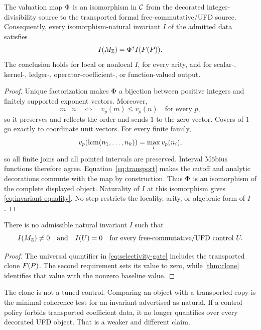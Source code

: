 \begin{theorem}
\label{thm:clone}
The valuation map \(\Phi\) is an isomorphism in \(\mathcal C\) from the
decorated integer-divisibility source to the transported formal
free-commutative/UFD source.  Consequently, every isomorphism-natural
invariant \(I\) of the admitted data satisfies
\begin{equation}
 I(M_{\mathbb Z})=\Phi^*I(F(P)).
 \label{eq:invariant-equality}
\end{equation}
The conclusion holds for local or nonlocal \(I\), for every arity, and for
scalar-, kernel-, ledger-, operator-coefficient-, or function-valued output.
\end{theorem}
\begin{proof}
Unique factorization makes \(\Phi\) a bijection between positive integers
and finitely supported exponent vectors.  Moreover,
\begin{equation}
 m\mid n
 \quad\Longleftrightarrow\quad
 v_p(m)\le v_p(n)\quad\text{for every }p,
 \label{eq:order-transport}
\end{equation}
so it preserves and reflects the order and sends \(1\) to the zero vector.
Covers of \(1\) go exactly to coordinate unit vectors.  For every finite
family,
\begin{equation}
 v_p(\operatorname{lcm}(n_1,\ldots,n_k))=\max_i v_p(n_i),
 \label{eq:join-transport}
\end{equation}
so all finite joins and all pointed intervals are preserved.  Interval
M{\"o}bius functions therefore agree.  Equation~\eqref{eq:transport} makes
the cutoff and analytic decorations commute with the map by construction.
Thus \(\Phi\) is an isomorphism of the complete displayed object.
Naturality of \(I\) at this isomorphism gives
\eqref{eq:invariant-equality}.  No step restricts the locality, arity, or
algebraic form of \(I\).
\end{proof}

\begin{corollary}
\label{cor:selectivity}
There is no admissible natural invariant \(I\) such that
\begin{equation}
 I(M_{\mathbb Z})\ne0
 \quad\text{and}\quad
 I(U)=0\quad\text{for every free-commutative/UFD control }U.
 \label{eq:selectivity-gate}
\end{equation}
\end{corollary}
\begin{proof}
The universal quantifier in \eqref{eq:selectivity-gate} includes the
transported clone \(F(P)\).  The second requirement sets its value to
zero, while \cref{thm:clone} identifies that value with the nonzero baseline
value.
\end{proof}

The clone is not a tuned control.  Comparing an object with a transported
copy is the minimal coherence test for an invariant advertised as natural.
If a control policy forbids transported coefficient data, it no longer
quantifies over every decorated UFD object.  That is a weaker and different
claim.
